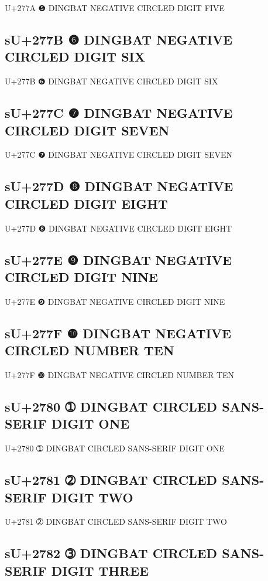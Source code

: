 U+277A ❺ DINGBAT NEGATIVE CIRCLED DIGIT FIVE

\subsection{sU+277B ❻ DINGBAT NEGATIVE CIRCLED DIGIT SIX}

U+277B ❻ DINGBAT NEGATIVE CIRCLED DIGIT SIX

\subsection{sU+277C ❼ DINGBAT NEGATIVE CIRCLED DIGIT SEVEN}

U+277C ❼ DINGBAT NEGATIVE CIRCLED DIGIT SEVEN

\subsection{sU+277D ❽ DINGBAT NEGATIVE CIRCLED DIGIT EIGHT}

U+277D ❽ DINGBAT NEGATIVE CIRCLED DIGIT EIGHT

\subsection{sU+277E ❾ DINGBAT NEGATIVE CIRCLED DIGIT NINE}

U+277E ❾ DINGBAT NEGATIVE CIRCLED DIGIT NINE

\subsection{sU+277F ❿ DINGBAT NEGATIVE CIRCLED NUMBER TEN}

U+277F ❿ DINGBAT NEGATIVE CIRCLED NUMBER TEN

\subsection{sU+2780 ➀ DINGBAT CIRCLED SANS-SERIF DIGIT ONE}

U+2780 ➀ DINGBAT CIRCLED SANS-SERIF DIGIT ONE

\subsection{sU+2781 ➁ DINGBAT CIRCLED SANS-SERIF DIGIT TWO}

U+2781 ➁ DINGBAT CIRCLED SANS-SERIF DIGIT TWO

\subsection{sU+2782 ➂ DINGBAT CIRCLED SANS-SERIF DIGIT THREE}

